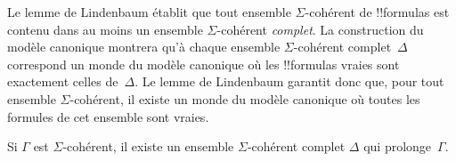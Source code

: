 \documentclass[../../../include/open-logic-section]{subfiles}
\begin{document}


Le lemme de Lindenbaum établit que tout ensemble $\Sigma$-cohérent de
!!{formula}s est contenu dans au moins un ensemble $\Sigma$-cohérent
\emph{complet}. La construction du modèle canonique montrera qu'à
chaque ensemble $\Sigma$-cohérent complet~$\Delta$ correspond un monde
du modèle canonique où les !!{formula}s vraies sont exactement celles
de~$\Delta$. Le lemme de Lindenbaum garantit donc que, pour tout
ensemble $\Sigma$-cohérent, il existe un monde du modèle canonique où
toutes les formules de cet ensemble sont vraies.

\begin{thm}
  Si $\Gamma$ est $\Sigma$-cohérent, il existe un ensemble
  $\Sigma$-cohérent complet $\Delta$ qui prolonge~$\Gamma$.
\end{thm}
\end{document}
